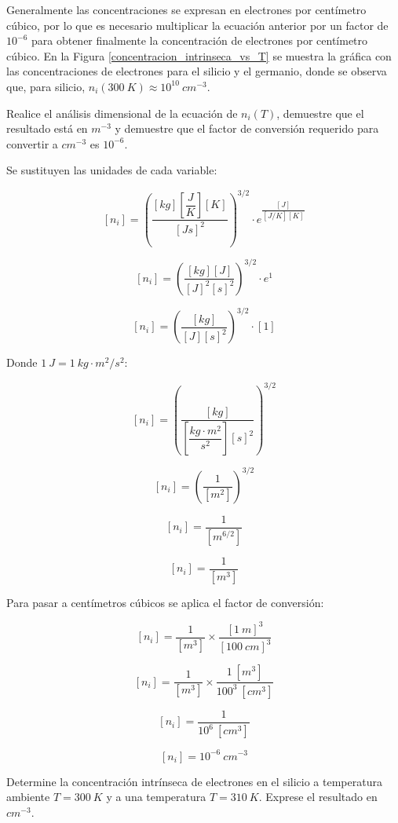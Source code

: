 Generalmente las concentraciones se expresan en electrones por centímetro cúbico, por lo que es necesario multiplicar la ecuación anterior por un factor de $10^{-6}$ para obtener finalmente la concentración de electrones por centímetro cúbico. En la Figura \ref{concentracion_intrinseca_vs_T} se muestra la gráfica con las concentraciones de electrones para el silicio y el germanio, donde se observa que, para silicio, $n_i(300\ K) \approx 10^{10}\ cm^{-3}$.


\begin{ejemplo} %
Realice el análisis dimensional de la ecuación de $n_i(T)$, demuestre que el resultado está en $m^{-3}$ y demuestre que el factor de conversión requerido para convertir a $cm^{-3}$ es $10^{-6}$.
\end{ejemplo}

\begin{solucion} %
Se sustituyen las unidades de cada variable:

\[ [n_i] = \left( \dfrac{[kg]\left[\dfrac{J}{K}\right][K]}{[Js]^2} \right)^{3/2} \cdot e^{\dfrac{[J]}{[J/K][K]}} \]

\[ [n_i] = \left(\dfrac{[kg][J]}{[J]^2 [s]^2} \right)^{3/2} \cdot{} e^1 \]

\[ [n_i] = \left( \dfrac{[kg]}{[J] [s]^2} \right)^{3/2} \cdot [1] \]

Donde $1\ J=1\ kg\cdot{}m^2/s^2$:

\[ [n_i] = \left( \dfrac{[kg]}{\left[ \dfrac{kg\cdot{}m^2}{s^2} \right] [s]^2} \right)^{3/2} \]

\[ [n_i] = \left( \dfrac{1}{[m^2]} \right)^{3/2} \]

\[ [n_i] = \dfrac{1}{[m^{6/2}]} \]

\[ [n_i] = \dfrac{1}{[m^3]} \]

Para pasar a centímetros cúbicos se aplica el factor de conversión:

\[ [n_i] = \dfrac{1}{[m^3]} \times \dfrac{[1\ m]^3}{[100\ cm]^3} \]

\[ [n_i] = \dfrac{1}{[m^3]} \times \dfrac{1\ [m^3]}{100^3\ [cm^3]} \]

\[ [n_i] = \dfrac{1}{10^6\ [cm^3]} \]

\[ [n_i] = 10^{-6}\ cm^{-3} \]
\end{solucion}

\newpage
\begin{ejemplo}
Determine la concentración intrínseca de electrones en el silicio a temperatura ambiente $T=300\ K$ y a una temperatura $T=310\ K$. Exprese el resultado en $cm^{-3}$.
\end{ejemplo}

